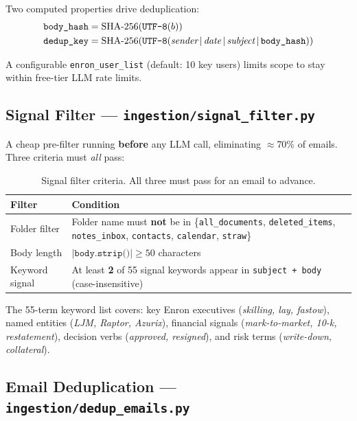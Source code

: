 \documentclass[11pt,a4paper]{article}
\newcommand{\code}[1]{\texttt{\small#1}}
\begin{document}
Two computed properties drive deduplication:
\begin{align*}
  \texttt{body\_hash} &= \mathrm{SHA\text{-}256}\!\left(\texttt{UTF\text{-}8}(b)\right) \\
  \texttt{dedup\_key} &= \mathrm{SHA\text{-}256}\!\left(\texttt{UTF\text{-}8}\!\left(
      \textit{sender}\,|\,\textit{date}\,|\,\textit{subject}\,|\,\texttt{body\_hash}
    \right)\right)
\end{align*}

A configurable \code{enron\_user\_list} (default: 10 key users) limits scope to
stay within free-tier LLM rate limits.

\subsection{Signal Filter — \code{ingestion/signal\_filter.py}}

A cheap pre-filter running \textbf{before} any LLM call, eliminating $\approx$70\%
of emails.  Three criteria must \emph{all} pass:

\begin{table}[H]
\centering
\small
\begin{tabularx}{\linewidth}{L{2.8cm} X}
\toprule
{}
\color{white}\textbf{Filter} & \color{white}\textbf{Condition} \\
\midrule
Folder filter  & Folder name must \textbf{not} be in
  \{\code{all\_documents}, \code{deleted\_items}, \code{notes\_inbox},
  \code{contacts}, \code{calendar}, \code{straw}\} \\
Body length    & $|\texttt{body.strip()}| \geq 50$ characters \\
Keyword signal & At least \textbf{2} of 55 signal keywords appear in
  \code{subject + body} (case-insensitive) \\
\bottomrule
\end{tabularx}
\caption{Signal filter criteria.  All three must pass for an email to advance.}
\end{table}

The 55-term keyword list covers: key Enron executives (\textit{skilling, lay,
fastow}), named entities (\textit{LJM, Raptor, Azurix}), financial signals
(\textit{mark-to-market, 10-k, restatement}), decision verbs (\textit{approved,
resigned}), and risk terms (\textit{write-down, collateral}).

\subsection{Email Deduplication — \code{ingestion/dedup\_emails.py}}
\end{document}
